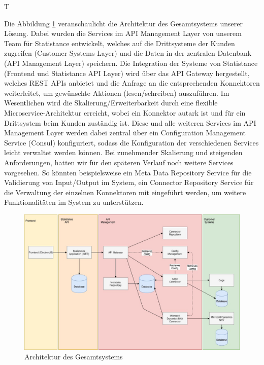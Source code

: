  {T}

Die Abbildung \ref{fig:Architektur des Gesamtsystems} veranschaulicht die Architektur des Gesamtsystems unserer Lösung. Dabei wurden die Services im API Management Layer von unserem Team für Statistance entwickelt, welches auf die Drittsysteme der Kunden zugreifen (Customer Systems Layer) und die Daten in der zentralen Datenbank (API Management Layer) speichern. Die Integration der Systeme von Statistance (Frontend und Statistance API Layer) wird über das API Gateway hergestellt, welches REST APIs anbietet und die Anfrage an die entsprechenden Konnektoren weiterleitet, um gewünschte Aktionen (lesen/schreiben) auszuführen. Im Wesentlichen wird die Skalierung/Erweiterbarkeit durch eine flexible Microservice-Architektur erreicht, wobei ein Konnektor autark ist und für ein Drittsystem beim Kunden zuständig ist. Diese und alle weiteren Services im API Management Layer werden dabei zentral über ein Configuration Management Service (Consul) konfiguriert, sodass die Konfiguration der verschiedenen Services leicht verwaltet werden können. Bei zunehmender Skalierung und steigenden Anforderungen, hatten wir für den späteren Verlauf noch weitere Services vorgesehen. So könnten beispielsweise ein Meta Data Repository Service für die Validierung von Input/Output im System, ein Connector Repository Service für die Verwaltung der einzelnen Konnektoren mit eingeführt werden, um weitere Funktionalitäten im System zu unterstützen.

\begin{figure}[!h]
\centering
\includegraphics[width=15cm]{images/00_software_architecture/01_Architecture_Overview/architecture_overview.jpg}
\caption{Architektur des Gesamtsystems}
\label{fig:Architektur des Gesamtsystems}
\end{figure}

